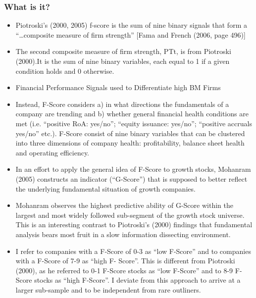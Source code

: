 \documentclass[12pt]{article}
\begin{document}
    \subsubsection{What is it?}

        \begin{itemize}

            \item Piotroski’s (2000, 2005) f-score is the sum of nine binary signals that form a “…composite measure of firm strength” [Fama and French (2006, page 496)] \citep{Choi2012}

            \item The second composite measure of firm strength, PTt, is from Piotroski (2000).It is the sum of nine binary variables, each equal to 1 if a given condition holds and 0 otherwise.\citep{Fama2006}

            \item Financial Performance Signals used to Differentiate high BM Firms \citep{Piotroski2000}

            \item Instead, F-Score considers a) in what directions the fundamentals of a company are trending and b) whether general financial health conditions are met (i.e. “positive RoA: yes/no”; “equity issuance: yes/no”; “positive accruals yes/no” etc.). F-Score consist of nine binary variables that can be clustered into three dimensions of company health: profitability, balance sheet health and operating efficiency.\citep{Mohr2012}
        
            \item In an effort to apply the general idea of F-Score to growth stocks, Mohanram (2005) constructs an indicator (“G-Score”) that is supposed to better reflect the underlying fundamental situation of growth companies. \citep{Mohr2012}

            \item Mohanram observes the highest predictive ability of G-Score within the largest and most widely followed sub-segment of the growth stock universe. This is an interesting contrast to Piotroski’s (2000) findings that fundamental analysis bears most fruit in a slow information dissecting environment. \citep{Mohr2012}

            \item I refer to companies with a F-Score of 0-3 as “low F-Score” and to companies with a F-Score of 7-9 as “high F- Score”. This is different from Piotroski (2000), as he referred to 0-1 F-Score stocks as “low F-Score” and to 8-9 F-Score stocks as “high F-Score”. I deviate from this approach to arrive at a larger sub-sample and to be independent from rare outliners. \citep{Mohr2012}
        \end{itemize}
\end{document}
